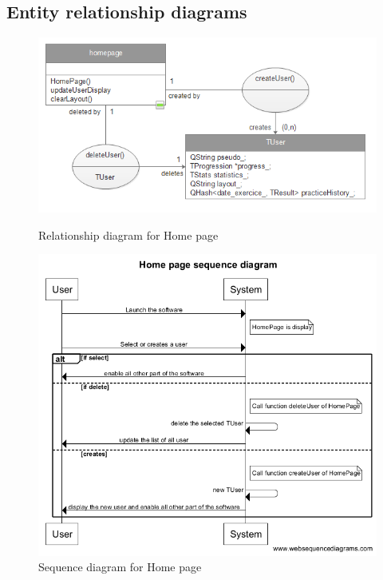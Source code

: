 \subsection{Entity relationship diagrams}
\begin{figure}[h]
	\centering
	\begin{minipage}[b]{0.25\textwidth}
      \includegraphics[height=1\textwidth]{images/Rhomepage.png}
      \caption{Relationship diagram for Home page}   
	\end{minipage}
	\begin{minipage}[b]{0.45\textwidth}
      \centering \includegraphics[height=1\textwidth]{images/Shomepage.png}
      \caption{Sequence diagram for Home page}
	\end{minipage}
\end{figure}

